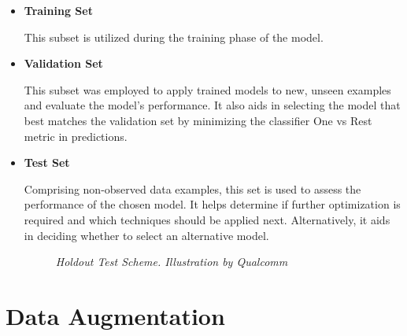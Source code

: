 \begin{itemize}

  \item \textbf{Training Set}

This subset is utilized during the training phase of the model.

\item \textbf{Validation Set}

This subset was employed to apply trained models to new, unseen examples and evaluate the model's performance. It also aids in selecting the model that best matches the validation set by minimizing the classifier One vs Rest metric in predictions.

\item \textbf{Test Set}

Comprising non-observed data examples, this set is used to assess the performance of the chosen model. It helps determine if further optimization is required and which techniques should be applied next. Alternatively, it aids in deciding whether to select an alternative model.


\begin{figure}[H]
\centering
{}
\caption[Holdout Test Scheme]{\textit{Holdout Test Scheme. Illustration by Qualcomm}}
{\label{fig:holdout-test-scheme}}
\end{figure}

\end{itemize}

\newpage

\section{Data Augmentation}

